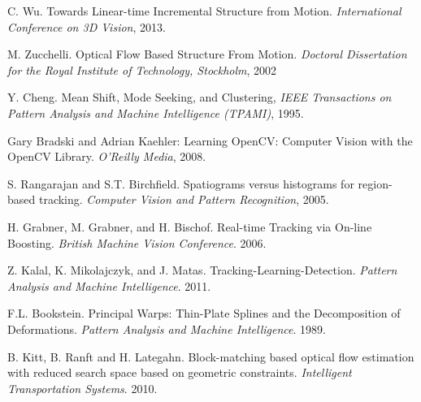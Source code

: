 \begin{thebibliography}{99}
C. Wu. Towards Linear-time Incremental Structure from Motion. {\it International Conference on 3D Vision}, 2013.

M. Zucchelli. Optical Flow Based Structure From Motion. {\it Doctoral Dissertation for the Royal Institute of Technology, Stockholm}, 2002

Y. Cheng. Mean Shift, Mode Seeking, and Clustering, {\it IEEE Transactions on Pattern Analysis and Machine Intelligence (TPAMI)}, 1995.

Gary Bradski and Adrian Kaehler: Learning OpenCV: Computer Vision with the OpenCV Library. {\it  O'Reilly Media}, 2008.

S. Rangarajan and S.T. Birchfield. Spatiograms versus histograms for region-based tracking. {\it Computer Vision and Pattern Recognition}, 2005.

H. Grabner, M. Grabner, and H. Bischof. Real-time Tracking via On-line Boosting. {\it British Machine Vision Conference}. 2006.

Z. Kalal, K. Mikolajczyk, and J. Matas. Tracking-Learning-Detection. {\it Pattern Analysis and Machine Intelligence}. 2011.

F.L. Bookstein. Principal Warps: Thin-Plate Splines and the Decomposition of Deformations. {\it Pattern Analysis and Machine Intelligence}. 1989.

B. Kitt, B. Ranft and H. Lategahn. Block-matching based optical flow estimation with reduced search space based on geometric constraints. {\it Intelligent Transportation Systems}. 2010.

\end{thebibliography}
